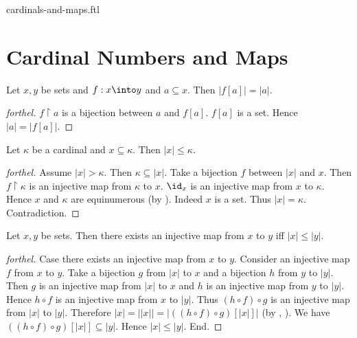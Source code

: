 \documentclass{naproche-library}
\begin{document}
\begin{smodule}{cardinals-and-maps.ftl}
  
  \begin{forthel}
  \end{forthel}

  \section*{Cardinal Numbers and Maps}  

  \begin{proposition}[forthel,id=SET_THEORY_06_5513850721927168]
    Let $x, y$ be sets and $f : x \into y$ and $a \subseteq x$.
    Then $|f[a]| = |a|$.
  \end{proposition}
  \begin{proof}[forthel]
    $f \restriction a$ is a bijection between $a$ and $f[a]$.
    $f[a]$ is a set.
    Hence $|a| = |f[a]|$.
  \end{proof}

  \begin{proposition}[forthel,id=SET_THEORY_06_6702394681735923]
    Let $\kappa$ be a cardinal and $x \subseteq \kappa$.
    Then $|x| \leq \kappa$.
  \end{proposition}
  \begin{proof}[forthel]
    Assume $|x| > \kappa$.
    Then $\kappa \subseteq |x|$.
    Take a bijection $f$ between $|x|$ and $x$.
    Then $f \restriction \kappa$ is an injective map from $\kappa$ to $x$.
    $\id_{x}$ is an injective map from $x$ to $\kappa$.
    Hence $x$ and $\kappa$ are equinumerous (by ).
    Indeed $x$ is a set.
    Thus $|x| = \kappa$.
    Contradiction.
  \end{proof}

  \begin{proposition}[forthel,id=SET_THEORY_06_407116133171200]
    Let $x, y$ be sets.
    Then there exists an injective map from $x$ to $y$ iff $|x| \leq |y|$.
  \end{proposition}
  \begin{proof}[forthel]
    Case there exists an injective map from $x$ to $y$.
      Consider an injective map $f$ from $x$ to $y$.
      Take a bijection $g$ from $|x|$ to $x$ and a bijection $h$ from $y$ to $|y|$.
      Then $g$ is an injective map from $|x|$ to $x$ and $h$ is an injective map from $y$ to $|y|$.
      Hence $h \circ f$ is an injective map from $x$ to $|y|$.
      Thus $(h \circ f) \circ g$ is an injective map from $|x|$ to $|y|$.
      Therefore $|x|
        = ||x||
        = |((h \circ f) \circ g)[|x|]|$
      (by , ).
      We have $((h \circ f) \circ g)[|x|] \subseteq |y|$.
      Hence $|x| \leq |y|$.
    End.


\end{proof}
\end{smodule}
\end{document}
